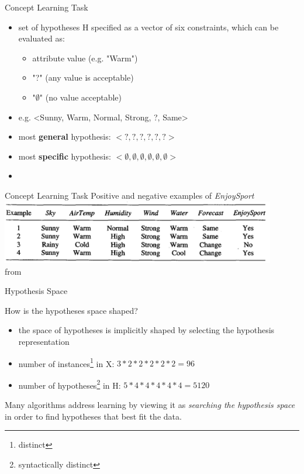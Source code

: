\documentclass{beamer}
\begin{document}
\begin{frame}{Concept Learning Task}
\begin{itemize}
\item set of hypotheses H specified as a vector of six constraints, which can be evaluated as:
\begin{itemize}
\item attribute value (e.g. "Warm")
\item "?" (any value is acceptable)
\item "$\emptyset$" (no value acceptable)
\end{itemize}
\item e.g. <Sunny, Warm, Normal, Strong, ?, Same>
\item most \textbf{general} hypothesis: $<?,?,?,?,?,?>$
\item most \textbf{specific} hypothesis: $<\emptyset,\emptyset,\emptyset,\emptyset,\emptyset,\emptyset>$
\item {}
\end{itemize}
\end{frame}

\begin{frame}{Concept Learning Task}
Positive and negative examples of \emph{EnjoySport}
\centering
\includegraphics[width=0.9\textwidth]{enjoysport_examples}
\\from \cite{mitchell1997a}
\end{frame}

\begin{frame}{Hypothesis Space}
\begin{block}{How is the hypotheses space shaped?}
\begin{itemize}
\item the space of hypotheses is implicitly shaped by selecting the hypothesis representation
\item number of instances\footnote{distinct} in X: $3*2*2*2*2*2=96$ 
\item number of hypotheses\footnote{syntactically distinct} in H: $5*4*4*4*4*4=5120$
\end{itemize}
\end{block}
Many algorithms address learning by viewing it as \emph{searching the hypothesis space} in order to find hypotheses that best fit the data.
\end{frame}
\end{document}
